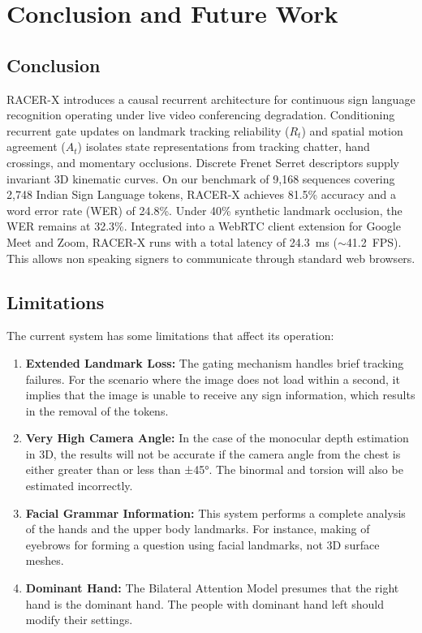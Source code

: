 \documentclass[conference]{IEEEtran}
\begin{document}
\section{Conclusion and Future Work}

\subsection{Conclusion}
RACER-X introduces a causal recurrent architecture for continuous sign language recognition operating under live video conferencing degradation. Conditioning recurrent gate updates on landmark tracking reliability ($R_t$) and spatial motion agreement ($A_t$) isolates state representations from tracking chatter, hand crossings, and momentary occlusions. Discrete Frenet Serret descriptors supply invariant 3D kinematic curves. On our benchmark of 9,168 sequences covering 2,748 Indian Sign Language tokens, RACER-X achieves 81.5\% accuracy and a word error rate (WER) of 24.8\%. Under 40\% synthetic landmark occlusion, the WER remains at 32.3\%. Integrated into a WebRTC client extension for Google Meet and Zoom, RACER-X runs with a total latency of 24.3~ms ($\sim$41.2~FPS). This allows non speaking signers to communicate through standard web browsers.

\subsection{Limitations}

The current system has some limitations that affect its operation:

\begin{enumerate}
    \item \textbf{Extended Landmark Loss:} The gating mechanism handles brief tracking failures. For the scenario where the image does not load within a second, it implies that the image is unable to receive any sign information, which results in the removal of the tokens.

    \item \textbf{Very High Camera Angle:} In the case of the monocular depth estimation in 3D, the results will not be accurate if the camera angle from the chest is either greater than or less than ±45°. The binormal and torsion will also be estimated incorrectly.

    \item \textbf{Facial Grammar Information:} This system performs a complete analysis of the hands and the upper body landmarks. For instance, making of eyebrows for forming a question using facial landmarks, not 3D surface meshes.

    \item \textbf{Dominant Hand:} The Bilateral Attention Model presumes that the right hand is the dominant hand. The people with dominant hand left should modify their settings.
\end{enumerate}
\end{document}
